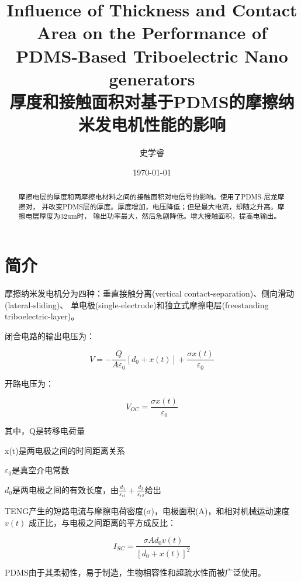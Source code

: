 \documentclass{ctexart}[UTF-8]        %
\begin{document}
\title{Influence of Thickness and Contact Area on the Performance of PDMS-Based Triboelectric Nano generators \\ [2ex] \small 厚度和接触面积对基于PDMS的摩擦纳米发电机性能的影响}
\author{史学睿}
\date{\today}
\maketitle



\begin{abstract}
    摩擦电层的厚度和两摩擦电材料之间的接触面积对电信号的影响。使用了PDMS-尼龙摩擦对，
    并改变PDMS层的厚度。厚度增加，电压降低；但是最大电流，却随之升高。摩擦电层厚度为32um时，
    输出功率最大，然后急剧降低。增大接触面积，提高电输出。
\end{abstract}

\section{简介}

摩擦纳米发电机分为四种：垂直接触分离(vertical contact-separation)、侧向滑动(lateral-sliding)、
单电极(single-electrode)和独立式摩擦电层(freestanding triboelectric-layer)。

闭合电路的输出电压为：

\begin{equation}
    V = - \frac{Q}{A \varepsilon_0}[d_0+x(t)]+ \frac{\sigma x(t)}{\varepsilon_0}
\end{equation}

开路电压为：

\begin{equation}
    V_{OC} = \frac{\sigma x(t)}{\varepsilon_0}
\end{equation}

其中，Q是转移电荷量

x(t)是两电极之间的时间距离关系

$\varepsilon_0$是真空介电常数

$d_0$是两电极之间的有效长度，由$\frac{d_1}{\varepsilon_{r1}} + \frac{d_2}{\varepsilon_{r2}} $给出

TENG产生的短路电流与摩擦电荷密度($\sigma$)，电极面积(A)，和相对机械运动速度$v(t)$
成正比，与电极之间距离的平方成反比：

\begin{equation}
    I_{SC} = \frac{\sigma A d_0 v(t)}{[d_0 + x(t)]^2}
\end{equation}

PDMS由于其柔韧性，易于制造，生物相容性和超疏水性而被广泛使用。
\end{document}
